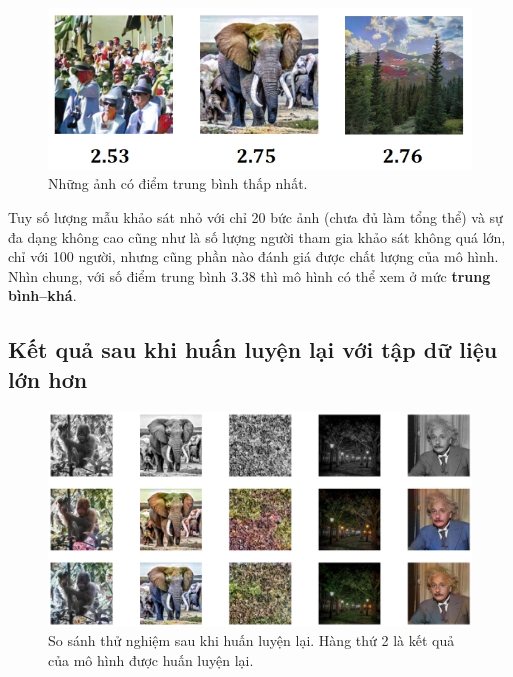 \documentclass[a4paper, 12pt]{article}
\begin{document}
\begin{figure}[!h]
\captionsetup{width=0.8\textwidth}
\centering
\includegraphics[width=12cm]{images/worst.PNG}
\caption{Những ảnh có điểm trung bình thấp nhất.}
\label{fig:worsttests}
\end{figure}

\noindent
Tuy số lượng mẫu khảo sát nhỏ với chỉ 20 bức ảnh (chưa đủ làm tổng thể) và sự đa dạng không cao cũng như là số lượng người tham gia khảo sát không quá lớn, chỉ với 100 người, nhưng cũng phần nào đánh giá được chất lượng của mô hình. Nhìn chung, với số điểm trung bình 3.38 thì mô hình có thể xem ở mức \textbf{trung bình--khá}.

\subsection{Kết quả sau khi huấn luyện lại với tập dữ liệu lớn hơn}\label{enhance_experiments}

\begin{figure}[!h]
\captionsetup{width=0.8\textwidth}
\centering
\includegraphics[width=15cm]{images/enhance.png}
\caption{So sánh thử nghiệm sau khi huấn luyện lại. Hàng thứ 2 là kết quả của mô hình được huấn luyện lại.}
\label{fig:enhance1}
\end{figure}
\end{document}
